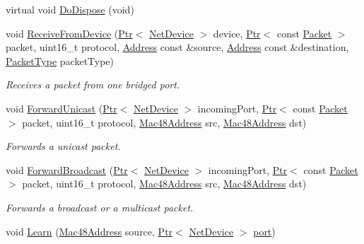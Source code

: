 \begin{DoxyCompactItemize}
\item 
virtual void \hyperlink{classns3_1_1BridgeNetDevice_ac8233fc38afed1acc24fc9d3cb19d498}{Do\+Dispose} (void)
\item 
void \hyperlink{classns3_1_1BridgeNetDevice_a958c86321b73b2c400b54bfad9d03e68}{Receive\+From\+Device} (\hyperlink{classns3_1_1Ptr}{Ptr}$<$ \hyperlink{classns3_1_1NetDevice}{Net\+Device} $>$ device, \hyperlink{classns3_1_1Ptr}{Ptr}$<$ const \hyperlink{classns3_1_1Packet}{Packet} $>$ packet, uint16\+\_\+t protocol, \hyperlink{classns3_1_1Address}{Address} const \&source, \hyperlink{classns3_1_1Address}{Address} const \&destination, \hyperlink{classns3_1_1NetDevice_ace65153f09144f55a0d3e702fc29d6b2}{Packet\+Type} packet\+Type)
\begin{DoxyCompactList}\small\item\em Receives a packet from one bridged port. \end{DoxyCompactList}\item 
void \hyperlink{classns3_1_1BridgeNetDevice_a815693fe0b0d77e33e1843fa7d991701}{Forward\+Unicast} (\hyperlink{classns3_1_1Ptr}{Ptr}$<$ \hyperlink{classns3_1_1NetDevice}{Net\+Device} $>$ incoming\+Port, \hyperlink{classns3_1_1Ptr}{Ptr}$<$ const \hyperlink{classns3_1_1Packet}{Packet} $>$ packet, uint16\+\_\+t protocol, \hyperlink{classns3_1_1Mac48Address}{Mac48\+Address} src, \hyperlink{classns3_1_1Mac48Address}{Mac48\+Address} dst)
\begin{DoxyCompactList}\small\item\em Forwards a unicast packet. \end{DoxyCompactList}\item 
void \hyperlink{classns3_1_1BridgeNetDevice_af3eff77ebe2114537d28aacc77adef45}{Forward\+Broadcast} (\hyperlink{classns3_1_1Ptr}{Ptr}$<$ \hyperlink{classns3_1_1NetDevice}{Net\+Device} $>$ incoming\+Port, \hyperlink{classns3_1_1Ptr}{Ptr}$<$ const \hyperlink{classns3_1_1Packet}{Packet} $>$ packet, uint16\+\_\+t protocol, \hyperlink{classns3_1_1Mac48Address}{Mac48\+Address} src, \hyperlink{classns3_1_1Mac48Address}{Mac48\+Address} dst)
\begin{DoxyCompactList}\small\item\em Forwards a broadcast or a multicast packet. \end{DoxyCompactList}\item 
void \hyperlink{classns3_1_1BridgeNetDevice_a9e0a97f4e3b3aa2cd1a3516cb739f721}{Learn} (\hyperlink{classns3_1_1Mac48Address}{Mac48\+Address} source, \hyperlink{classns3_1_1Ptr}{Ptr}$<$ \hyperlink{classns3_1_1NetDevice}{Net\+Device} $>$ \hyperlink{visualizer-ideas_8txt_a21ff1c530daf8435e00048b7fc2c58e3}{port})

\end{DoxyCompactItemize}

